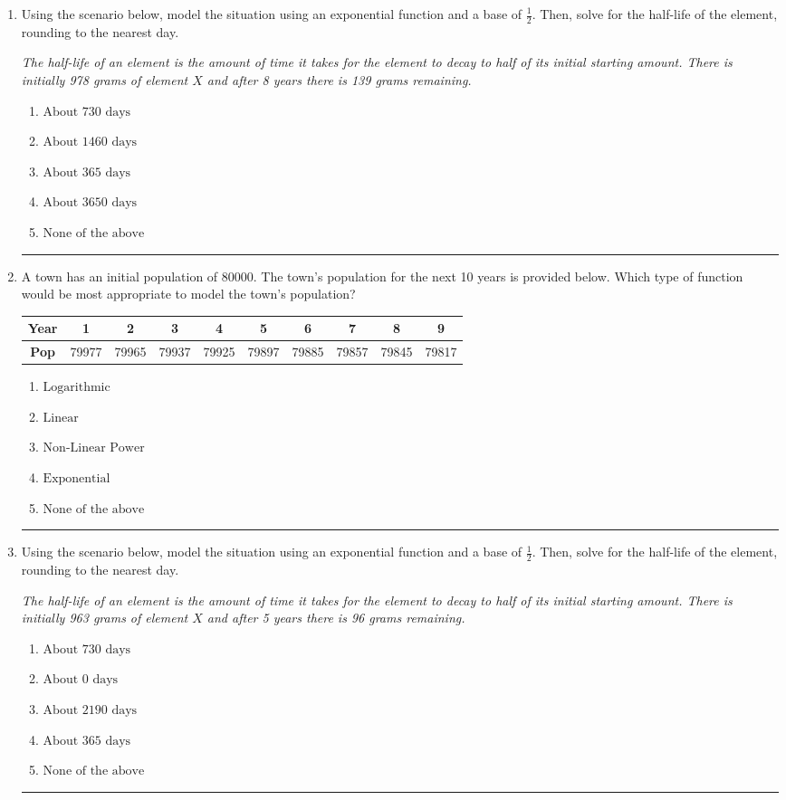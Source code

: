 \documentclass[14pt]{extbook}
\newcommand{\litem}[1]{\item#1\hspace*{-1cm}\rule{\textwidth}{0.4pt}}
\begin{document}
\begin{enumerate}
{\begin{enumerate}[label=\Alph*.]
\end{enumerate} }
\litem{
Using the scenario below, model the situation using an exponential function and a base of $\frac{1}{2}$. Then, solve for the half-life of the element, rounding to the nearest day.
\begin{center}
    \textit{ The half-life of an element is the amount of time it takes for the element to decay to half of its initial starting amount. There is initially 978 grams of element $X$ and after 8 years there is 139 grams remaining. }
\end{center}
\begin{enumerate}[label=\Alph*.]
\item \( \text{About } 730 \text{ days} \)
\item \( \text{About } 1460 \text{ days} \)
\item \( \text{About } 365 \text{ days} \)
\item \( \text{About } 3650 \text{ days} \)
\item \( \text{None of the above} \)

\end{enumerate} }
\litem{
A town has an initial population of 80000. The town's population for the next 10 years is provided below. Which type of function would be most appropriate to model the town's population?

\begin{tabular}{c|c|c|c|c|c|c|c|c|c}
\textbf{Year} &1 &2 &3 &4 &5 &6 &7 &8 &9\tabularnewline \hline
\textbf{Pop} &79977 &79965 &79937 &79925 &79897 &79885 &79857 &79845 &79817\end{tabular}\begin{enumerate}[label=\Alph*.]
\item \( \text{Logarithmic} \)
\item \( \text{Linear} \)
\item \( \text{Non-Linear Power} \)
\item \( \text{Exponential} \)
\item \( \text{None of the above} \)

\end{enumerate} }
\litem{
Using the scenario below, model the situation using an exponential function and a base of $\frac{1}{2}$. Then, solve for the half-life of the element, rounding to the nearest day.
\begin{center}
    \textit{ The half-life of an element is the amount of time it takes for the element to decay to half of its initial starting amount. There is initially 963 grams of element $X$ and after 5 years there is 96 grams remaining. }
\end{center}
\begin{enumerate}[label=\Alph*.]
\item \( \text{About } 730 \text{ days} \)
\item \( \text{About } 0 \text{ days} \)
\item \( \text{About } 2190 \text{ days} \)
\item \( \text{About } 365 \text{ days} \)
\item \( \text{None of the above} \)


\end{enumerate}}
\end{enumerate}
\end{document}
